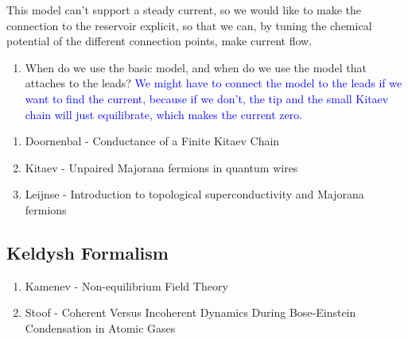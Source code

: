 This model can't support a steady current, so we would like to make the connection to the reservoir explicit, so that we can, by tuning the chemical potential of the different connection points, make current flow. 

\begin{tcolorbox}[title = Questions, colback = gray!5, colframe = black]
    \begin{enumerate}
        \item When do we use the basic model, and when do we use the model that attaches to the leads? \textcolor{blue}{We might have to connect the model to the leads if we want to find the current, because if we don't, the tip and the small Kitaev chain will just equilibrate, which makes the current zero.}
    \end{enumerate}
\end{tcolorbox}

 \begin{tcolorbox}[title = Sources, colback = gray!5, colframe = gray]
    \begin{enumerate} 
        \itemsep0em
        \item Doornenbal - Conductance of a Finite Kitaev Chain
        \item Kitaev - Unpaired Majorana fermions in quantum wires
        \item Leijnse - Introduction to topological superconductivity and Majorana fermions
    \end{enumerate}
    \end{tcolorbox}

\subsection{Keldysh Formalism}
\begin{tcolorbox}[title = Sources, colback = gray!5, colframe = gray]
    \begin{enumerate} 
        \itemsep0em
        \item Kamenev - Non-equilibrium Field Theory
        \item Stoof - Coherent Versus Incoherent Dynamics During Bose-Einstein Condensation in Atomic Gases
    \end{enumerate}
\end{tcolorbox}

